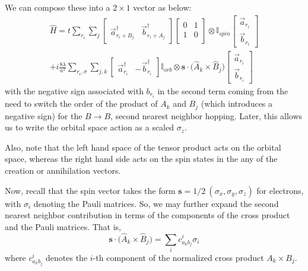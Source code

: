 \documentclass[10pt,a4paper]{article}
\begin{document}
\begin{multicols}{2}
We can compose these into a $2\times 1$ vector as below:\small
\begin{align*}
\hat{H} = t \sum_{r_i }\sum_{j}\begin{bmatrix} \vec{a}_{r_i+B_j}^{\dagger} & \vec{b}_{r_i+A_j}^{\dagger} \end{bmatrix}\begin{bmatrix} 0&1\\1&0\\ \end{bmatrix}\otimes \mathbb{I}_{spin}\begin{bmatrix} \vec{a}_{r_i} \\ \vec{b}_{r_i}\end{bmatrix}\\
 +i\frac{8\lambda}{a^2}\sum_{r_i,\sigma}\sum_{j,k}\begin{bmatrix} \vec{a}_{r_i}^{\dagger} & -\vec{b}_{r_i}^{\dagger} \end{bmatrix}\mathbb{I}_{orb}\otimes\mathbf{s}\cdot\big(\hat{A}_k\times \hat{B}_j\big)\begin{bmatrix} \vec{a}_{r_i} \\ \vec{b}_{r_i}\end{bmatrix}\end{align*}\normalsize
 with the negative sign associated with $b_{r_i}$ in the second term coming from the need to switch the order of the product of $A_k$ and $B_j$ (which introduces a negative sign) for the $B\rightarrow B$, second nearest neighbor hopping. Later, this allows us to write the orbital space action as a scaled $\sigma_z$.
 
 Also, note that the left hand space of the tensor product acts on the orbital space, whereas the right hand side acts on the spin states in the any of the creation or annihilation vectors.
 
Now, recall that the spin vector takes the form $\mathbf{s}= 1/2\ (\sigma_x,\sigma_y,\sigma_z)$ for electrons, with $\sigma_i$ denoting the Pauli matrices. So, we may further expand the second nearest neighbor contribution in terms of the components of the cross product and the Pauli matrices. That is,
$$
\mathbf{s}\cdot\big(\hat{A}_k\times \hat{B}_j\big) = \sum_i c_{a_k b_j}^i\sigma_i
$$
where $c_{a_k b_j}^i$ denotes the $i$-th component of the normalized cross product $A_k\times B_j$.


\end{multicols}
\end{document}

